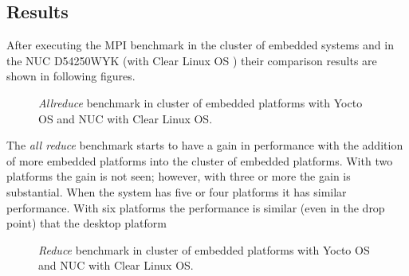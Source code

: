 \subsection{Results}

After executing the MPI benchmark in the cluster of embedded systems  and in
the NUC D54250WYK \cite{NUC} (with Clear Linux OS \cite{clear-linux}) their
comparison results are shown in following figures. 


\begin{figure}[H]
\begin{center}
\end{center}
\caption{\textit{Allreduce} benchmark in cluster of embedded platforms with Yocto OS and NUC
with Clear Linux OS.}
\label{all_reduce_cluster}
\end{figure}

The \textit{all reduce} benchmark starts to have a gain in performance with the
addition of more embedded platforms into the cluster of embedded platforms.
With two platforms the gain is not seen; however, with three or more the gain is
substantial.  When the system has five or four platforms it has similar
performance. With six platforms the performance is similar (even in the drop
point) that the desktop platform \cite{NUC}

\begin{figure}[H]
\begin{center}
\end{center}
\caption{\textit{Reduce} benchmark in cluster of embedded platforms with Yocto OS and NUC
with Clear Linux OS.}
\label{reduce_cluster}
\end{figure}

